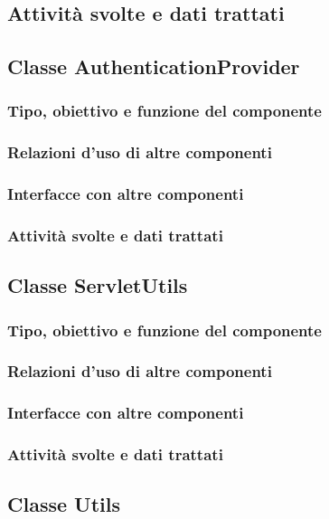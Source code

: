\subsection*{Attivit\`a svolte e dati trattati}

\subsection{Classe AuthenticationProvider}
\subsubsection*{Tipo, obiettivo e funzione del componente}
\subsubsection*{Relazioni d'uso di altre componenti}
\subsubsection*{Interfacce con altre componenti}
\subsubsection*{Attivit\`a svolte e dati trattati}

\subsection{Classe ServletUtils}
\subsubsection*{Tipo, obiettivo e funzione del componente}
\subsubsection*{Relazioni d'uso di altre componenti}
\subsubsection*{Interfacce con altre componenti}
\subsubsection*{Attivit\`a svolte e dati trattati}

\subsection{Classe Utils}
